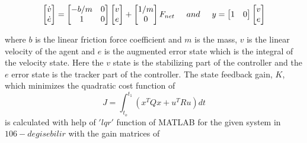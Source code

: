 \documentclass[twoside]{article}
\begin{document}
\begin{equation}
\begin{bmatrix}
\dot{v} \\ \dot{e}
\end{bmatrix}
=
\begin{bmatrix}
-b/m & 0 \\
1 & 0
\end{bmatrix}
\begin{bmatrix}
v \\ e
\end{bmatrix}
+ \begin{bmatrix}
1/m \\ 0
\end{bmatrix}
F_{net} \hspace{0.5cm} and
\hspace{0.5cm}
y = \begin{bmatrix}
1 & 0
\end{bmatrix}
\begin{bmatrix}
v \\ e
\end{bmatrix}
\end{equation}

where $b$ is the linear friction force coefficient and $m$ is the mass, $v$  is the linear velocity of the agent and $e$ is the augmented error state which is the integral of the velocity state. Here the $v$ state is the stabilizing part of the controller and the $e$ error state is the tracker part of the controller. The state feedback gain, $K$, which minimizes the quadratic cost function of
\begin{equation}
 J = \int_{t_o}^{t_1}(x^TQx + u^TRu) dt
\end{equation}
is calculated with help of $'lqr'$ function of MATLAB for the given system in $106 - degisebilir$ with the gain matrices of 
\end{document}
